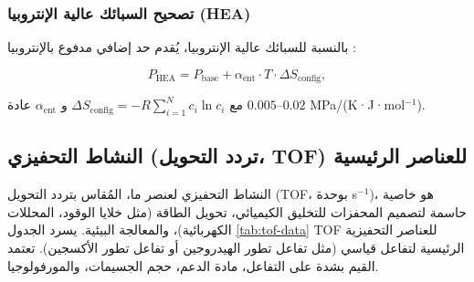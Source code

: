 \documentclass[11pt,a4paper]{article}
\begin{document}
\begin{otherlanguage}{arabic}
		\subsubsection{تصحيح السبائك عالية الإنتروبيا (HEA)}
		
		بالنسبة للسبائك عالية الإنتروبيا، يُقدم حد إضافي مدفوع بالإنتروبيا \cite{Wen2019, Yang2012}:
		
		\begin{equation}
			P_{\text{HEA}} = P_{\text{base}} + \alpha_{\text{ent}} \cdot T \cdot \Delta S_{\text{config}},
			\label{eq:hea}
		\end{equation}
		
		مع \(\Delta S_{\text{config}} = -R \sum_{i=1}^{N} c_i \ln c_i\) و \(\alpha_{\text{ent}}\) عادة \(0.005\)–\(0.02\) MPa/(K·J·mol\(^{-1}\)).
		
		\subsection{النشاط التحفيزي (تردد التحويل، TOF) للعناصر الرئيسية}
		\label{subsec:catalytic-activity}
		
		النشاط التحفيزي لعنصر ما، المُقاس بتردد التحويل (TOF، بوحدة s\(^{-1}\))، هو خاصية حاسمة لتصميم المحفزات للتخليق الكيميائي، تحويل الطاقة (مثل خلايا الوقود، المحللات الكهربائية)، والمعالجة البيئية. يسرد الجدول \ref{tab:tof-data} TOF للعناصر التحفيزية الرئيسية لتفاعل قياسي (مثل تفاعل تطور الهيدروجين أو تفاعل تطور الأكسجين). تعتمد القيم بشدة على التفاعل، مادة الدعم، حجم الجسيمات، والمورفولوجيا.
		

\end{otherlanguage}
\end{document}
